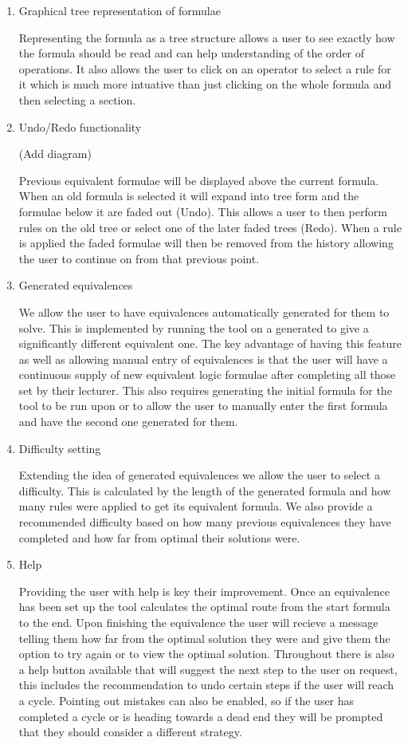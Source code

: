\documentclass{report}
\begin{document}
\begin{enumerate}
\item Graphical tree representation of formulae

Representing the formula as a tree structure allows a user to see exactly how the formula should be read and can help understanding of the order of operations. It also allows the user to click on an operator to select a rule for it which is much more intuative than just clicking on the whole formula and then selecting a section.

\item Undo/Redo functionality

(Add diagram)

Previous equivalent formulae will be displayed above the current formula. When an old formula is selected it will expand into tree form and the formulae below it are faded out (Undo). This allows a user to then perform rules on the old tree or select one of the later faded trees (Redo). When a rule is applied the faded formulae will then be removed from the history allowing the user to continue on from that previous point.

\item Generated equivalences

We allow the user to have equivalences automatically generated for them to solve. This is implemented by running the tool on a generated to give a significantly different equivalent one. The key advantage of having this feature as well as allowing manual entry of equivalences is that the user will have a continuous supply of new equivalent logic formulae after completing all those set by their lecturer. This also requires generating the initial formula for the tool to be run upon or to allow the user to manually enter the first formula and have the second one generated for them.

\item Difficulty setting

Extending the idea of generated equivalences we allow the user to select a difficulty. This is calculated by the length of the generated formula and how many rules were applied to get its equivalent formula. We also provide a recommended difficulty based on how many previous equivalences they have completed and how far from optimal their solutions were.

\item Help

Providing the user with help is key their improvement. Once an equivalence has been set up the tool calculates the optimal route from the start formula to the end. Upon finishing the equivalence the user will recieve a message telling them how far from the optimal solution they were and give them the option to try again or to view the optimal solution. Throughout there is also a help button available that will suggest the next step to the user on request, this includes the recommendation to undo certain steps if the user will reach a cycle. Pointing out mistakes can also be enabled, so if the user has completed a cycle or is heading towards a dead end they will be prompted that they should consider a different strategy.

\end{enumerate}
\end{document}
